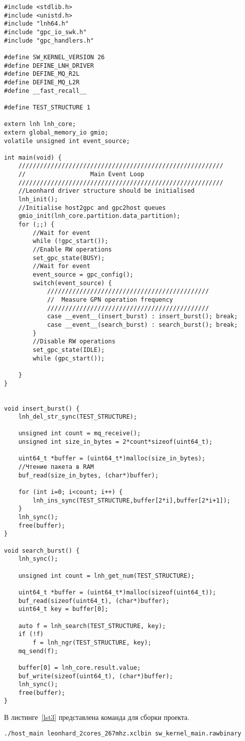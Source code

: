 \begin{lstlisting}[caption={Код программы по индивидуальному варианту sw\_kernel\_main.c}, label=lst2, style=Go]
#include <stdlib.h>
#include <unistd.h>
#include "lnh64.h"
#include "gpc_io_swk.h"
#include "gpc_handlers.h"

#define SW_KERNEL_VERSION 26
#define DEFINE_LNH_DRIVER
#define DEFINE_MQ_R2L
#define DEFINE_MQ_L2R
#define __fast_recall__

#define TEST_STRUCTURE 1

extern lnh lnh_core;
extern global_memory_io gmio;
volatile unsigned int event_source;

int main(void) {
    /////////////////////////////////////////////////////////
    //                  Main Event Loop
    /////////////////////////////////////////////////////////
    //Leonhard driver structure should be initialised
    lnh_init();
    //Initialise host2gpc and gpc2host queues
    gmio_init(lnh_core.partition.data_partition);
    for (;;) {
        //Wait for event
        while (!gpc_start());
        //Enable RW operations
        set_gpc_state(BUSY);
        //Wait for event
        event_source = gpc_config();
        switch(event_source) {
            /////////////////////////////////////////////
            //  Measure GPN operation frequency
            /////////////////////////////////////////////
            case __event__(insert_burst) : insert_burst(); break;
            case __event__(search_burst) : search_burst(); break;
        }
        //Disable RW operations
        set_gpc_state(IDLE);
        while (gpc_start());

    }
}

 
void insert_burst() {
    lnh_del_str_sync(TEST_STRUCTURE);

    unsigned int count = mq_receive();
    unsigned int size_in_bytes = 2*count*sizeof(uint64_t);

    uint64_t *buffer = (uint64_t*)malloc(size_in_bytes);
    //Чтение пакета в RAM
    buf_read(size_in_bytes, (char*)buffer);

    for (int i=0; i<count; i++) {
        lnh_ins_sync(TEST_STRUCTURE,buffer[2*i],buffer[2*i+1]);
    }
    lnh_sync();
    free(buffer);
}

void search_burst() {
    lnh_sync(); 

    unsigned int count = lnh_get_num(TEST_STRUCTURE);

    uint64_t *buffer = (uint64_t*)malloc(sizeof(uint64_t));
    buf_read(sizeof(uint64_t), (char*)buffer);
    uint64_t key = buffer[0];

    auto f = lnh_search(TEST_STRUCTURE, key);
    if (!f)
        f = lnh_ngr(TEST_STRUCTURE, key);
    mq_send(f);

    buffer[0] = lnh_core.result.value;
    buf_write(sizeof(uint64_t), (char*)buffer);  
    lnh_sync();
    free(buffer);
}

\end{lstlisting}

\par В листинге~\ref{lst3} представлена команда для сборки проекта.
\begin{lstlisting}[caption={Код программы по индивидуальному варианту sw\_kernel\_main.c}, label=lst3, style=Go]
./host_main leonhard_2cores_267mhz.xclbin sw_kernel_main.rawbinary
\end{lstlisting}
\newpage